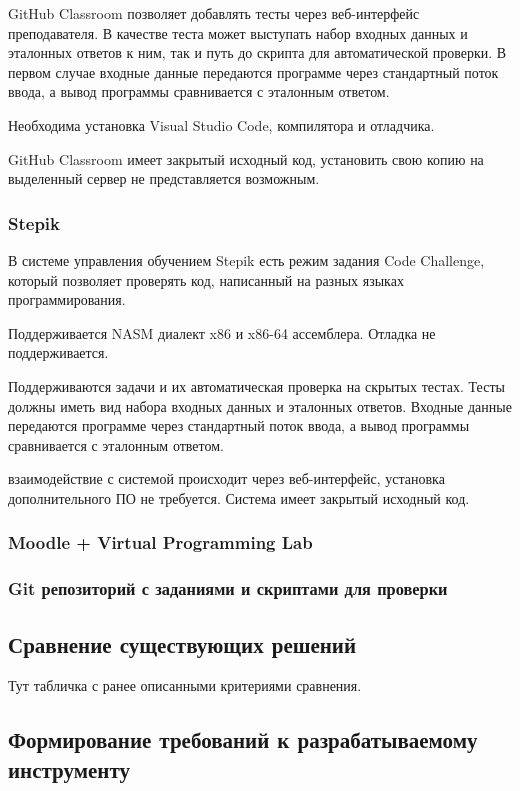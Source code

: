 \documentclass[a4paper,article,14pt]{extarticle}
\begin{document}
GitHub Classroom позволяет добавлять тесты через веб-интерфейс преподавателя. В качестве теста может выступать набор входных данных и эталонных ответов к ним, так и путь до скрипта для автоматической проверки. В первом случае входные данные передаются программе через стандартный поток ввода, а вывод программы сравнивается с эталонным ответом.

Необходима установка Visual Studio Code, компилятора и отладчика.

GitHub Classroom имеет закрытый исходный код, установить свою копию на выделенный сервер не представляется возможным.

\subsubsection{Stepik}

В системе управления обучением Stepik есть режим задания Code Challenge, который позволяет проверять код, написанный на разных языках программирования.

Поддерживается NASM диалект x86 и x86-64 ассемблера. Отладка не поддерживается.

Поддерживаются задачи и их автоматическая проверка на скрытых тестах. Тесты должны иметь вид набора входных данных и эталонных ответов. Входные данные передаются программе через стандартный поток ввода, а вывод программы сравнивается с эталонным ответом.

взаимодействие с системой происходит через веб-интерфейс, установка дополнительного ПО не требуется. Система имеет закрытый исходный код.

\subsubsection{Moodle + Virtual Programming Lab}

\subsubsection{Git репозиторий с заданиями и скриптами для проверки}

\subsection{Сравнение существующих решений}

Тут табличка с ранее описанными критериями сравнения.

\subsection{Формирование требований к разрабатываемому инструменту}
\end{document}
